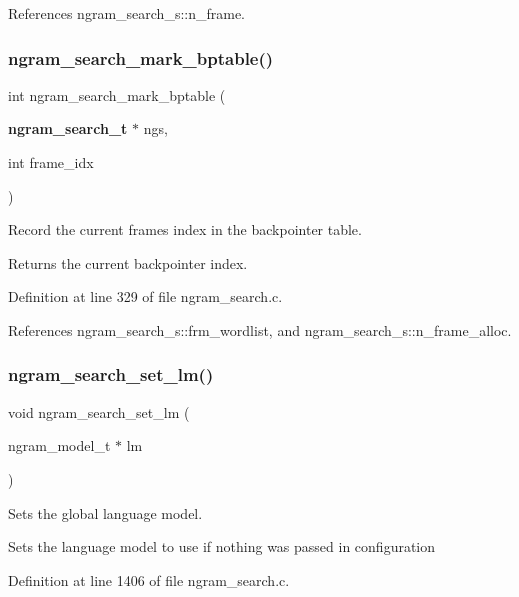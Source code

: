 References ngram\+\_\+search\+\_\+s\+::n\+\_\+frame.

\mbox{\label{ngram__search_8h_a7772e007b7d7fdf437c87aeb08b59c71}} 
\subsubsection{ngram\+\_\+search\+\_\+mark\+\_\+bptable()}
{\footnotesize\ttfamily int ngram\+\_\+search\+\_\+mark\+\_\+bptable (\begin{DoxyParamCaption}\item[{\textbf{ ngram\+\_\+search\+\_\+t} $\ast$}]{ngs,  }\item[{int}]{frame\+\_\+idx }\end{DoxyParamCaption})}



Record the current frame\textquotesingle{}s index in the backpointer table. 

\begin{DoxyReturn}{Returns}
the current backpointer index. 
\end{DoxyReturn}


Definition at line 329 of file ngram\+\_\+search.\+c.



References ngram\+\_\+search\+\_\+s\+::frm\+\_\+wordlist, and ngram\+\_\+search\+\_\+s\+::n\+\_\+frame\+\_\+alloc.

\mbox{\label{ngram__search_8h_a0e681022d3fa0e63da066aad123245e7}} 
\subsubsection{ngram\+\_\+search\+\_\+set\+\_\+lm()}
{\footnotesize\ttfamily void ngram\+\_\+search\+\_\+set\+\_\+lm (\begin{DoxyParamCaption}\item[{ngram\+\_\+model\+\_\+t $\ast$}]{lm }\end{DoxyParamCaption})}



Sets the global language model. 

Sets the language model to use if nothing was passed in configuration 

Definition at line 1406 of file ngram\+\_\+search.\+c.

